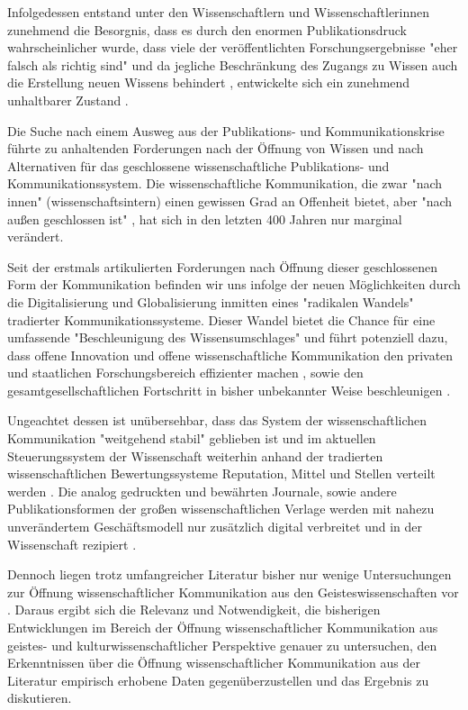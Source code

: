 Infolgedessen entstand unter den Wissenschaftlern und Wissenschaftlerinnen zunehmend die Besorgnis, dass es durch den enormen Publikationsdruck wahrscheinlicher wurde, dass viele der veröffentlichten Forschungsergebnisse "eher falsch als richtig sind" \cite{Ioannidis_2005} und da jegliche Beschränkung des Zugangs zu Wissen auch die Erstellung neuen Wissens behindert \cite{cite:5} \cite{cite:8} \cite{Luhmann1998}, entwickelte sich ein zunehmend unhaltbarer Zustand \cite{Schekman_2013}.

Die Suche nach einem Ausweg aus der Publikations- und Kommunikationskrise führte zu anhaltenden Forderungen nach der Öffnung von Wissen und nach Alternativen für das geschlossene wissenschaftliche Publikations- und Kommunikationssystem. Die wissenschaftliche Kommunikation, die zwar "nach innen" (wissenschaftsintern) einen gewissen Grad an Offenheit bietet, aber "nach außen geschlossen ist" \cite{kelty_2004}, hat sich in den letzten 400 Jahren nur marginal verändert.

Seit der erstmals artikulierten Forderungen nach Öffnung dieser geschlossenen Form der Kommunikation befinden wir uns infolge der neuen Möglichkeiten durch die Digitalisierung und Globalisierung \cite{mcluhan_1962_gutenberg} inmitten eines "radikalen Wandels" \cite{poynder_2011_suber} tradierter Kommunikationssysteme. Dieser Wandel bietet die Chance für eine umfassende "Beschleunigung des Wissensumschlages" \cite{Wenzel_2003} und führt potenziell dazu, dass offene Innovation und offene wissenschaftliche Kommunikation den privaten und staatlichen Forschungsbereich effizienter machen \cite{chesbrough_2006_open}, sowie den gesamtgesellschaftlichen Fortschritt in bisher unbekannter Weise beschleunigen \cite{cite:7}.

Ungeachtet dessen ist unübersehbar, dass das System der wissenschaftlichen Kommunikation "weitgehend stabil" \cite{Hanekop_2014} geblieben ist und im aktuellen Steuerungssystem der Wissenschaft weiterhin anhand der tradierten wissenschaftlichen Bewertungssysteme Reputation, Mittel und Stellen verteilt werden \cite{cite:4}. Die analog gedruckten und bewährten Journale, sowie andere Publikationsformen der großen wissenschaftlichen Verlage werden mit nahezu unverändertem Geschäftsmodell nur zusätzlich digital verbreitet \cite{Hanekop_2014} \cite{boai_2012} und in der Wissenschaft rezipiert \cite{suchen}.

Dennoch liegen trotz umfangreicher Literatur bisher nur wenige Untersuchungen zur Öffnung wissenschaftlicher Kommunikation aus den Geisteswissenschaften vor \cite{naeder_2010_open}. Daraus ergibt sich die Relevanz und Notwendigkeit, die bisherigen Entwicklungen im Bereich der Öffnung wissenschaftlicher Kommunikation aus geistes- und kulturwissenschaftlicher Perspektive genauer zu untersuchen, den Erkenntnissen über die Öffnung wissenschaftlicher Kommunikation aus der Literatur empirisch erhobene Daten gegenüberzustellen und das Ergebnis zu diskutieren.

